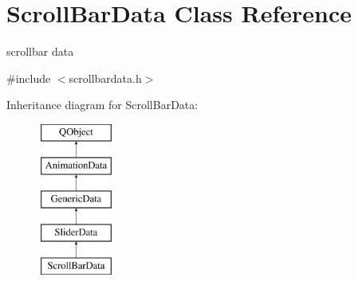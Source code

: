 \hypertarget{class_scroll_bar_data}{}\section{Scroll\+Bar\+Data Class Reference}
\label{class_scroll_bar_data}


scrollbar data  




{\ttfamily \#include $<$scrollbardata.\+h$>$}

Inheritance diagram for Scroll\+Bar\+Data\+:\begin{figure}[H]
\begin{center}
\leavevmode
\includegraphics[height=5.000000cm]{class_scroll_bar_data}
\end{center}
\end{figure}

